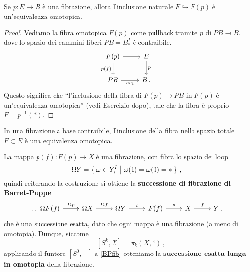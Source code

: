 \begin{lemma}
	Se $p:E \to B$ è una fibrazione,
	allora l'inclusione naturale $F \hookrightarrow F(p)$
	è un'equivalenza omotopica.
	\begin{proof}
		Vediamo la fibra omotopica $F(p)$ come pullback
		tramite $p$ di $PB \to B$,
		dove lo spazio dei cammini liberi 
		$PB = B^{I}_{\ast}$ è contraibile.
		\begin{equation*}
			\begin{tikzcd}
			F(p) \ar[r] \ar[d, "p(f)"'] 
			& E \ar[d, "p"] \\
			PB \ar[r, "ev_{1}"'] & B \,.
			\end{tikzcd}
		\end{equation*}
		Questo significa che ``l'inclusione della fibra di $F(p) \to PB$
		in $F(p)$ è un'equivalenza omotopica'' (vedi Esercizio dopo),
		tale che la fibra è proprio $F = p^{-1}(\ast)$.
	\end{proof}
\end{lemma}

\begin{exercise}
	In una fibrazione a base contraibile,
	l'inclusione della fibra nello spazio totale $F \subset E$
	è una equivalenza omotopica.
\end{exercise}


La mappa $p(f):F(p) \to X$ è una fibrazione, 
con fibra lo spazio dei loop 
\begin{equation*}
	\Omega Y = \Set{\omega \in Y^{I}_{\ast} | \omega(1) = \omega(0) = \ast}\,,
\end{equation*}
quindi reiterando la costruzione
si ottiene la \textbf{successione di fibrazione di Barret-Puppe}
\begin{equation}
	\begin{tikzcd}\label{BPfib}
		\dots \ar[r] \Omega F(f) \ar[r, "\Omega p"]
		& \Omega X \ar[r, "\Omega f"]
		& \Omega Y \ar[r, "i"]
		& F(f) \ar[r, "p"]
		& X \ar[r,"f"]
		& Y\,,
	\end{tikzcd}
\end{equation}
che è una successione esatta,
dato che ogni mappa è una fibrazione
(a meno di omotopia).
Dunque, siccome
\begin{equation*}
	[S^{0},\Omega^{k}X] = [S^{k}, X] = \pi_{k}(X,\ast)\,,
\end{equation*}
applicando il funtore $[S^{0},-]$ a \eqref{BPfib}
otteniamo la \textbf{successione esatta lunga in omotopia}
della fibrazione.

